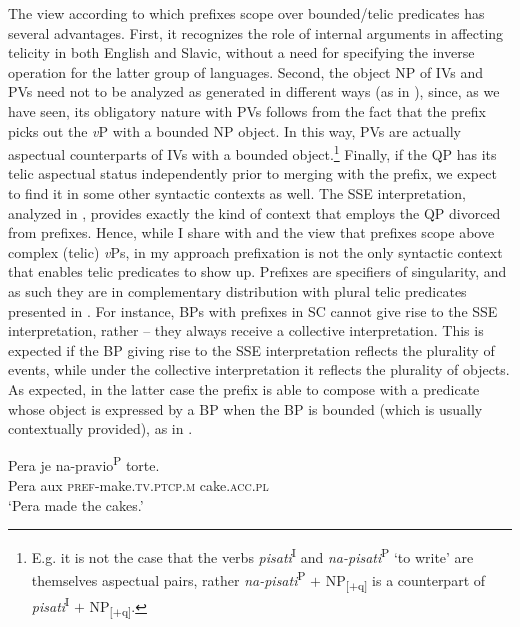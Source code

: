 \documentclass[output=paper,colorlinks,citecolor=brown]{langscibook}
\begin{document}
The view according to which prefixes scope over bounded/telic predicates has several advantages. First, it recognizes the role of internal arguments in affecting telicity in both English and Slavic, without a need for specifying the inverse operation for the latter group of languages. Second, the object NP of IVs and PVs need not to be analyzed as generated in different ways (as in \citealt{Basilico2008}), since, as we have seen, its obligatory nature with PVs follows from the fact that the prefix picks out the \textit{v}P with a bounded NP object. In this way, PVs are actually aspectual counterparts of IVs with a bounded object.\footnote{E.g. it is not the case that the verbs \textit{pisati}\textsuperscript{I} and \textit{na-pisati}\textsuperscript{P} `to write' are themselves aspectual pairs, rather \textit{na-pisati}\textsuperscript{P} $+$ NP\textsubscript{[$+$q]} is a counterpart of \textit{pisati}\textsuperscript{I} $+$ NP\textsubscript{[$+$q]}.} Finally, if the QP has its telic aspectual status independently prior to merging with the prefix, we expect to find it in some other syntactic contexts as well. The SSE interpretation, analyzed in , provides exactly the kind of context that employs the QP divorced from prefixes. Hence, while I share with \citet[]{Krifka1992} and \citet[]{Verkuyl1999} the view that prefixes scope above complex (telic) \textit{v}Ps, in my approach prefixation is not the only syntactic context that enables telic predicates to show up. 
Prefixes are specifiers of singularity, and as such they are in complementary distribution with plural telic predicates presented in . For instance, BPs with prefixes in SC cannot give rise to the SSE interpretation, rather -- they always receive a collective interpretation. This is expected if the BP giving rise to the SSE interpretation reflects the plurality of events, while under the collective interpretation it reflects the plurality of objects. As expected, in the latter case the prefix is able to compose with a predicate whose object is expressed by a BP when the BP is bounded (which is usually contextually provided), as in .

\ea \label{mil:ex:BPs-collective}
{
\gll Pera je na-pravio\textsuperscript{P} torte. \\ Pera aux \textsc{pref}-make.\textsc{tv.ptcp.m} cake.\textsc{acc.pl}
\\
\glt `Pera made the cakes.'}
\z
\end{document}
